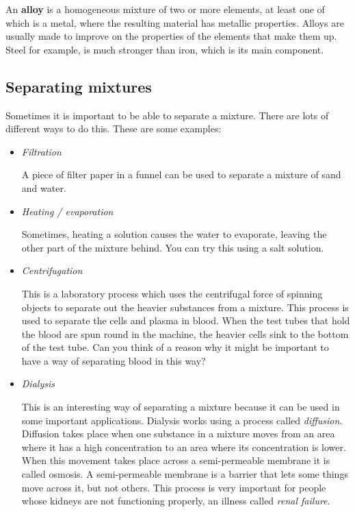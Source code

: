 An \textbf{alloy} is a homogeneous mixture of two or more elements, at least one of which is a metal, where the resulting material has metallic properties. Alloys are usually made to improve on the properties of the elements that make them up. Steel for example, is much stronger than iron, which is its main component.

\subsection{Separating mixtures}

Sometimes it is important to be able to separate a mixture. There are lots of different ways to do this. These are some examples:

\begin{itemize}

\item{\textit{Filtration}

A piece of filter paper in a funnel can be used to separate a mixture of sand and water.}

\item{\textit{Heating / evaporation}

Sometimes, heating a solution causes the water to evaporate, leaving the other part of the mixture behind. You can try this using a salt solution.}

\item{\textit{Centrifugation}

This is a laboratory process which uses the centrifugal force of spinning objects to separate out the heavier substances from a mixture. This process is used to separate the cells and plasma in blood. When the test tubes that hold the blood are spun round in the machine, the heavier cells sink to the bottom of the test tube. Can you think of a reason why it might be important to have a way of separating blood in this way?}

\item{\textit{Dialysis}

This is an interesting way of separating a mixture because it can be used in some important applications. Dialysis works using a process called \textit{diffusion}. Diffusion takes place when one substance in a mixture moves from an area where it has a high concentration to an area where its concentration is lower. When this movement takes place across a semi-permeable membrane it is called osmosis. A semi-permeable membrane is a barrier that lets some things move across it, but not others. This process is very important for people whose kidneys are not functioning properly, an illness called \textit{renal failure}.} 
\end{itemize}

